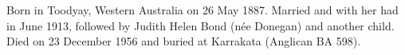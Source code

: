 
Born in Toodyay, Western Australia on 26 May 1887.\cite{EADoneganGrave}
Married  and with her
had  in June 1913, followed by Judith Helen Bond (n\'{e}e Donegan) and another child.
Died on 23 December 1956 and buried at Karrakata (Anglican BA 598).\cite{EADoneganGrave}
